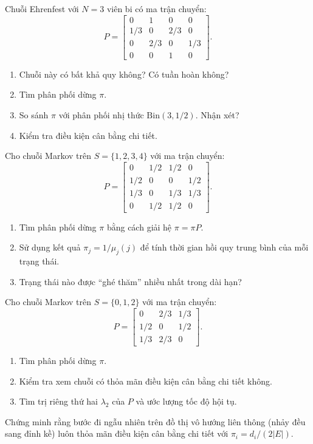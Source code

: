 \begin{exercise}
\label{ex:ch7-4}
Chuỗi Ehrenfest với $N = 3$ viên bi có ma trận chuyển:
\[
  P = \begin{bmatrix}
    0 & 1 & 0 & 0 \\
    1/3 & 0 & 2/3 & 0 \\
    0 & 2/3 & 0 & 1/3 \\
    0 & 0 & 1 & 0
  \end{bmatrix}.
\]
\begin{enumerate}[label=(\alph*)]
  \item Chuỗi này có bất khả quy không? Có tuần hoàn không?
  \item Tìm phân phối dừng $\pi$.
  \item So sánh $\pi$ với phân phối nhị thức $\mathrm{Bin}(3, 1/2)$. Nhận xét?
  \item Kiểm tra điều kiện cân bằng chi tiết.
\end{enumerate}
\end{exercise}

\begin{exercise}
\label{ex:ch7-5}
Cho chuỗi Markov trên $S = \{1, 2, 3, 4\}$ với ma trận chuyển:
\[
  P = \begin{bmatrix}
    0 & 1/2 & 1/2 & 0 \\
    1/2 & 0 & 0 & 1/2 \\
    1/3 & 0 & 1/3 & 1/3 \\
    0 & 1/2 & 1/2 & 0
  \end{bmatrix}.
\]
\begin{enumerate}[label=(\alph*)]
  \item Tìm phân phối dừng $\pi$ bằng cách giải hệ $\pi = \pi P$.
  \item Sử dụng kết quả $\pi_j = 1/\mu_j(j)$ để tính thời gian hồi quy trung bình
    của mỗi trạng thái.
  \item Trạng thái nào được ``ghé thăm'' nhiều nhất trong dài hạn?
\end{enumerate}
\end{exercise}

\begin{exercise}
\label{ex:ch7-6}
Cho chuỗi Markov trên $S = \{0, 1, 2\}$ với ma trận chuyển:
\[
  P = \begin{bmatrix}
    0 & 2/3 & 1/3 \\
    1/2 & 0 & 1/2 \\
    1/3 & 2/3 & 0
  \end{bmatrix}.
\]
\begin{enumerate}[label=(\alph*)]
  \item Tìm phân phối dừng $\pi$.
  \item Kiểm tra xem chuỗi có thỏa mãn điều kiện cân bằng chi tiết không.
  \item Tìm trị riêng thứ hai $\lambda_2$ của $P$ và ước lượng tốc độ hội tụ.
\end{enumerate}
\end{exercise}

\begin{exercise}
\label{ex:ch7-7}
Chứng minh rằng bước đi ngẫu nhiên trên đồ thị vô hướng liên thông (nhảy đều sang đỉnh kề)
luôn thỏa mãn điều kiện cân bằng chi tiết với $\pi_i = d_i / (2|E|)$.
\end{exercise}
